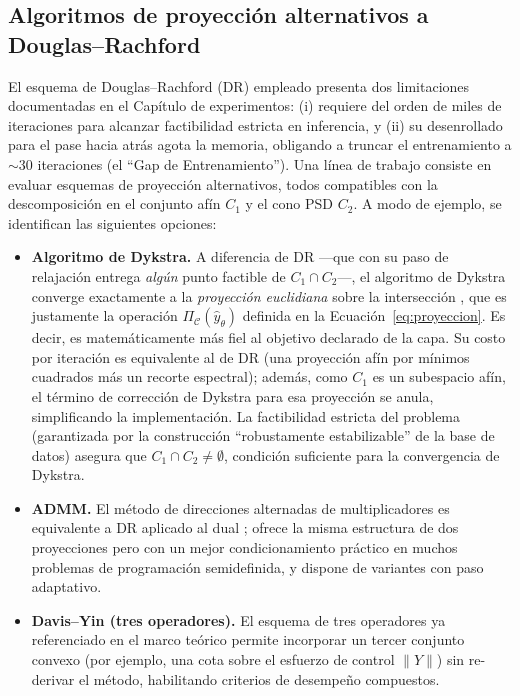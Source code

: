 \subsection{Algoritmos de proyección alternativos a Douglas--Rachford}
{\color{revcolor}
El esquema de Douglas--Rachford (DR) empleado presenta dos limitaciones documentadas en el Capítulo de experimentos: (i) requiere del orden de miles de iteraciones para alcanzar factibilidad estricta en inferencia, y (ii) su desenrollado para el pase hacia atrás agota la memoria, obligando a truncar el entrenamiento a $\sim 30$ iteraciones (el ``Gap de Entrenamiento''). Una línea de trabajo consiste en evaluar esquemas de proyección alternativos, todos compatibles con la descomposición en el conjunto afín $C_1$ y el cono PSD $C_2$. A modo de ejemplo, se identifican las siguientes opciones:

\begin{itemize}
    \item \textbf{Algoritmo de Dykstra.} A diferencia de DR ---que con su paso de relajación entrega \emph{algún} punto factible de $C_1 \cap C_2$---, el algoritmo de Dykstra converge exactamente a la \emph{proyección euclidiana} sobre la intersección \cite{boyle1986dykstra, bauschke1994dykstra}, que es justamente la operación $\Pi_{\mathcal{C}}(\hat{y}_\theta)$ definida en la Ecuación~\eqref{eq:proyeccion}. Es decir, es matemáticamente más fiel al objetivo declarado de la capa. Su costo por iteración es equivalente al de DR (una proyección afín por mínimos cuadrados más un recorte espectral); además, como $C_1$ es un subespacio afín, el término de corrección de Dykstra para esa proyección se anula, simplificando la implementación. La factibilidad estricta del problema (garantizada por la construcción ``robustamente estabilizable'' de la base de datos) asegura que $C_1 \cap C_2 \neq \emptyset$, condición suficiente para la convergencia de Dykstra.


    \item \textbf{ADMM.} El método de direcciones alternadas de multiplicadores es equivalente a DR aplicado al dual \cite{boyd2011admm}; ofrece la misma estructura de dos proyecciones pero con un mejor condicionamiento práctico en muchos problemas de programación semidefinida, y dispone de variantes con paso adaptativo.


    \item \textbf{Davis--Yin (tres operadores).} El esquema de tres operadores ya referenciado en el marco teórico \cite{davis2017convergence} permite incorporar un tercer conjunto convexo (por ejemplo, una cota sobre el esfuerzo de control $\lVert Y \rVert$) sin re-derivar el método, habilitando criterios de desempeño compuestos.
\end{itemize}
}

